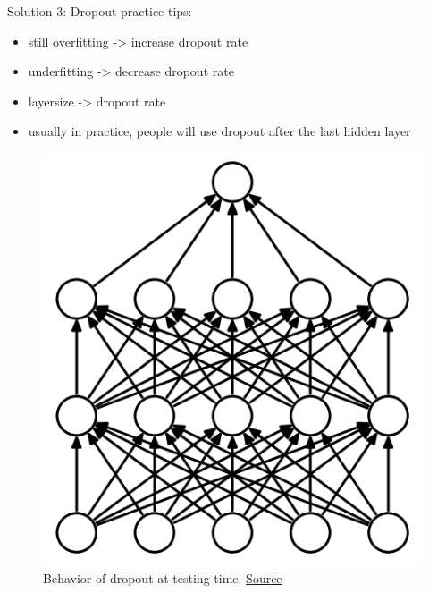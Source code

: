 \begin{frame}{Solution 3: Dropout}
	practice tips:
	\begin{itemize}
		\item still overfitting -> increase dropout rate
		\item underfitting -> decrease dropout rate
		\item layersize -> dropout rate
		\item usually in practice, people will use dropout after the last hidden layer
	\end{itemize}
	
	\begin{figure}[H]
		\centering
		\includegraphics[height=0.4\textheight]{Figs/Dropout-before.png}
		\caption{Behavior of dropout at testing time. \href{https://www.cs.toronto.edu/~hinton/absps/JMLRdropout.pdf}{Source}}
	\end{figure}
\end{frame}



